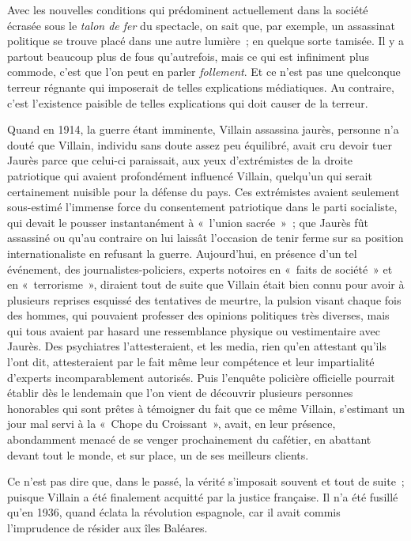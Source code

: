\documentclass[french,twoside]{book} %
\begin{document}
\noindent Avec les nouvelles conditions qui prédominent actuellement dans la société écrasée sous le \emph{talon de fer} du spectacle, on sait que, par exemple, un assassinat politique se trouve placé dans une autre lumière ; en quelque sorte tamisée. Il y a partout beaucoup plus de fous qu’autrefois, mais ce qui est infiniment plus commode, c’est que l’on peut en parler \emph{follement}. Et ce n’est pas une quelconque terreur régnante qui imposerait de telles explications médiatiques. Au contraire, c’est l’existence paisible de telles explications qui doit causer de la terreur.\par
Quand en 1914, la guerre étant imminente, Villain assassina jaurès, personne n’a douté que Villain, individu sans doute assez peu équilibré, avait cru devoir tuer Jaurès parce que celui-ci paraissait, aux yeux d’extrémistes de la droite patriotique qui avaient profondément influencé Villain, quelqu’un qui serait certainement nuisible pour la défense du pays. Ces extrémistes avaient seulement sous-estimé l’immense force du consentement patriotique dans le parti socialiste, qui devait le pousser instantanément à « l’union sacrée » ; que Jaurès fût assassiné ou qu’au contraire on lui laissât l’occasion de tenir ferme sur sa position internationaliste en refusant la guerre. Aujourd’hui, en présence d’un tel événement, des journalistes-policiers, experts notoires en « faits de société » et en « terrorisme », diraient tout de suite que Villain était bien connu pour avoir à plusieurs reprises esquissé des tentatives de meurtre, la pulsion visant chaque fois des hommes, qui pouvaient professer des opinions politiques très diverses, mais qui tous avaient par hasard une ressemblance physique ou vestimentaire avec Jaurès. Des psychiatres l’attesteraient, et les media, rien qu’en attestant qu’ils l’ont dit, attesteraient par le fait même leur compétence et leur impartialité d’experts incomparablement autorisés. Puis l’enquête policière officielle pourrait établir dès le lendemain que l’on vient de découvrir plusieurs personnes honorables qui sont prêtes à témoigner du fait que ce même Villain, s’estimant un jour mal servi à la « Chope du Croissant », avait, en leur présence, abondamment menacé de se venger prochainement du cafétier, en abattant devant tout le monde, et sur place, un de ses meilleurs clients.\par
Ce n’est pas dire que, dans le passé, la vérité s’imposait souvent et tout de suite ; puisque Villain a été finalement acquitté par la justice française. Il n’a été fusillé qu’en 1936, quand éclata la révolution espagnole, car il avait commis l’imprudence de résider aux îles Baléares.\par
\end{document}
